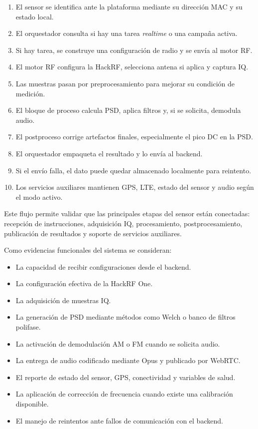 \begin{enumerate}
  \item El sensor se identifica ante la plataforma mediante su dirección MAC y su
  estado local.

  \item El orquestador consulta si hay una tarea \textit{realtime} o una campaña
  activa.

  \item Si hay tarea, se construye una configuración de radio y se envía al motor
  RF.

  \item El motor RF configura la HackRF, selecciona antena si aplica y captura IQ.

  \item Las muestras pasan por preprocesamiento para mejorar su condición de
  medición.

  \item El bloque de proceso calcula PSD, aplica filtros y, si se solicita,
  demodula audio.

  \item El postproceso corrige artefactos finales, especialmente el pico DC en la
  PSD.

  \item El orquestador empaqueta el resultado y lo envía al backend.

  \item Si el envío falla, el dato puede quedar almacenado localmente para
  reintento.

  \item Los servicios auxiliares mantienen GPS, LTE, estado del sensor y audio
  según el modo activo.
\end{enumerate}

Este flujo permite validar que las principales etapas del sensor están conectadas:
recepción de instrucciones, adquisición IQ, procesamiento, postprocesamiento,
publicación de resultados y soporte de servicios auxiliares.

Como evidencias funcionales del sistema se consideran:

\begin{itemize}
  \item La capacidad de recibir configuraciones desde el backend.
  \item La configuración efectiva de la HackRF One.
  \item La adquisición de muestras IQ.
  \item La generación de PSD mediante métodos como Welch o banco de filtros
  polifase.
  \item La activación de demodulación AM o FM cuando se solicita audio.
  \item La entrega de audio codificado mediante Opus y publicado por WebRTC.
  \item El reporte de estado del sensor, GPS, conectividad y variables de salud.
  \item La aplicación de corrección de frecuencia cuando existe una calibración
  disponible.
  \item El manejo de reintentos ante fallos de comunicación con el backend.
\end{itemize}

